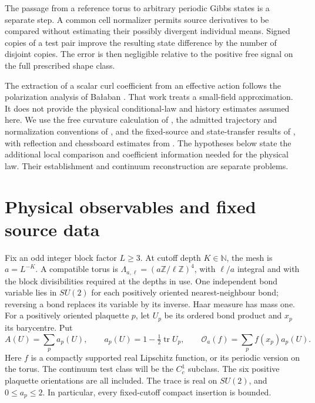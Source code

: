 \documentclass[11pt,letterpaper,reqno]{amsart}
\numberwithin{equation}{section}
\theoremstyle{definition}
\theoremstyle{remark}
\begin{document}
The passage from a reference torus to arbitrary periodic Gibbs
states is a separate step. A common cell normalizer permits
source derivatives to be compared without estimating their
possibly divergent individual means. Signed copies of a test
pair improve the resulting state difference by the number of
disjoint copies. The error is then negligible relative to the
positive free signal on the full prescribed shape class.

The extraction of a scalar curl coefficient from an effective
action follows the polarization analysis of
Ba\l aban \cite[\S5, pp.~292--297]{Bal87}. That work treats a
small-field approximation. It does not provide the physical
conditional-law and history estimates assumed here. We use the
free curvature calculation of \cite{GI}, the admitted trajectory
and normalization conventions of \cite{RT}, and the fixed-source
and state-transfer results of \cite{SI}, with reflection and
chessboard estimates from \cite{LP}. The hypotheses below state
the additional local comparison and coefficient information
needed for the physical law. Their establishment and continuum
reconstruction are separate problems.

\section{Physical observables and fixed source data}
\label{fp:sec-setting}

Fix an odd integer block factor \(L\ge3\). At cutoff depth
\(K\in\mathbb N\), the mesh is \(a=L^{-K}\). A compatible
torus is \(\Lambda_{a,\ell}=(a\mathbb Z/\ell\mathbb Z)^4\),
with \(\ell/a\) integral and with the block divisibilities required
at the depths in use. One independent bond variable lies in
\(SU(2)\) for each positively oriented nearest-neighbour bond;
reversing a bond replaces its variable by its inverse. Haar measure
has mass one. For a positively oriented plaquette \(p\), let
\(U_p\) be its ordered bond product and \(x_p\) its barycentre.
Put
\begin{equation}\label{fp:eq-physical-observable}
 A(U)=\sum_p a_p(U),\qquad
 a_p(U)=1-\tfrac12\operatorname{tr}U_p,\qquad
 \mathcal O_a(f)=\sum_p f(x_p)a_p(U).
\end{equation}
Here \(f\) is a compactly supported real Lipschitz function, or
its periodic version on the torus. The continuum test class will
be the \(C_c^1\) subclass. The six positive plaquette
orientations are all included. The trace is real on \(SU(2)\),
and \(0\le a_p\le2\). In particular, every fixed-cutoff compact
insertion is bounded.
\end{document}
